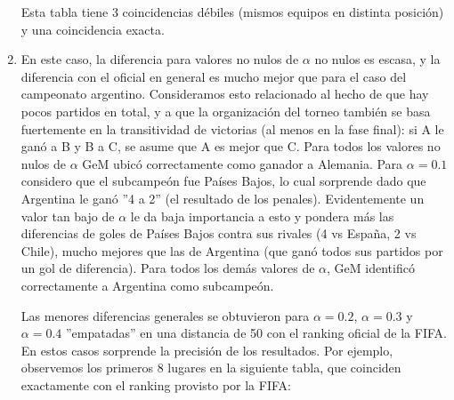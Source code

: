 \begin{enumerate}
        \par Esta tabla tiene 3 coincidencias débiles (mismos equipos en
        distinta posición) y una coincidencia exacta.\\

    \item En este caso, la diferencia para valores no nulos de $\alpha$ no nulos
        es escasa, y la diferencia con el oficial en general es mucho mejor que
        para el caso del campeonato argentino. Consideramos esto relacionado al
        hecho de que hay pocos partidos en total, y a que la organización del
        torneo también se basa fuertemente en la transitividad de victorias (al
        menos en la fase final): si A le ganó a B y B a C, se asume que A es
        mejor que C.  Para todos los valores no nulos de $\alpha$ GeM ubicó
        correctamente como ganador a Alemania. Para $\alpha=0.1$ considero que
        el subcampeón fue Países Bajos, lo cual sorprende dado que Argentina le
        ganó ''4 a 2'' (el resultado de los penales). Evidentemente un valor tan
        bajo de $\alpha$ le da baja importancia a esto y pondera más las
        diferencias de goles de Países Bajos contra sus rivales (4 vs España, 2
        vs Chile), mucho mejores que las de Argentina (que ganó todos sus
        partidos por un gol de diferencia). Para todos los demás valores de
        $\alpha$, GeM identificó correctamente a Argentina como subcampeón.

        \par Las menores diferencias generales se obtuvieron para $\alpha=0.2$,
        $\alpha=0.3$ y $\alpha=0.4$ ''empatadas'' en una distancia de 50 con el
        ranking oficial de la FIFA. En estos casos sorprende la precisión de los
        resultados. Por ejemplo, observemos los primeros 8 lugares en la
        siguiente tabla, que coinciden exactamente con el ranking provisto por
        la FIFA:


\end{enumerate}
